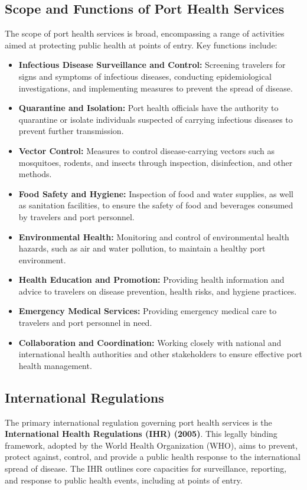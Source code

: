 \documentclass[12pt,a4paper]{article}
\begin{document}
\subsection*{Scope and Functions of Port Health Services}
The scope of port health services is broad, encompassing a range of activities aimed at protecting public health at points of entry. Key functions include:
\begin{itemize}
    \item \textbf{Infectious Disease Surveillance and Control:} Screening travelers for signs and symptoms of infectious diseases, conducting epidemiological investigations, and implementing measures to prevent the spread of disease.
    \item \textbf{Quarantine and Isolation:} Port health officials have the authority to quarantine or isolate individuals suspected of carrying infectious diseases to prevent further transmission.
    \item \textbf{Vector Control:} Measures to control disease-carrying vectors such as mosquitoes, rodents, and insects through inspection, disinfection, and other methods.
    \item \textbf{Food Safety and Hygiene:} Inspection of food and water supplies, as well as sanitation facilities, to ensure the safety of food and beverages consumed by travelers and port personnel.
    \item \textbf{Environmental Health:} Monitoring and control of environmental health hazards, such as air and water pollution, to maintain a healthy port environment.
    \item \textbf{Health Education and Promotion:} Providing health information and advice to travelers on disease prevention, health risks, and hygiene practices.
    \item \textbf{Emergency Medical Services:} Providing emergency medical care to travelers and port personnel in need.
    \item \textbf{Collaboration and Coordination:} Working closely with national and international health authorities and other stakeholders to ensure effective port health management.
\end{itemize}

\subsection*{International Regulations}
The primary international regulation governing port health services is the \textbf{International Health Regulations (IHR) (2005)}. This legally binding framework, adopted by the World Health Organization (WHO), aims to prevent, protect against, control, and provide a public health response to the international spread of disease. The IHR outlines core capacities for surveillance, reporting, and response to public health events, including at points of entry.
\end{document}

